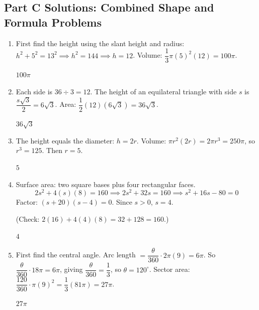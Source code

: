 \documentclass[14pt]{extarticle}
\begin{document}
\subsection*{Part C Solutions: Combined Shape and Formula Problems}
\begin{enumerate}
  \item First find the height using the slant height and radius: \(h^2 + 5^2 = 13^2 \implies h^2 = 144 \implies h = 12\). Volume: \(\dfrac{1}{3}\pi(5)^2(12) = 100\pi\).

  \(\boxed{100\pi}\)

  \item Each side is \(36 \div 3 = 12\). The height of an equilateral triangle with side \(s\) is \(\dfrac{s\sqrt{3}}{2} = 6\sqrt{3}\). Area: \(\dfrac{1}{2}(12)(6\sqrt{3}) = 36\sqrt{3}\).

  \(\boxed{36\sqrt{3}}\)

  \item The height equals the diameter: \(h = 2r\). Volume: \(\pi r^2(2r) = 2\pi r^3 = 250\pi\), so \(r^3 = 125\). Then \(r = 5\).

  \(\boxed{5}\)

  \item Surface area: two square bases plus four rectangular faces.
  \[
  2s^2 + 4(s)(8) = 160 \implies 2s^2 + 32s = 160 \implies s^2 + 16s - 80 = 0
  \]
  Factor: \((s + 20)(s - 4) = 0\). Since \(s > 0\), \(s = 4\).

  (Check: \(2(16) + 4(4)(8) = 32 + 128 = 160\).)

  \(\boxed{4}\)

  \item First find the central angle. Arc length \(= \dfrac{\theta}{360} \cdot 2\pi(9) = 6\pi\). So \(\dfrac{\theta}{360} \cdot 18\pi = 6\pi\), giving \(\dfrac{\theta}{360} = \dfrac{1}{3}\), so \(\theta = 120^\circ\). Sector area: \(\dfrac{120}{360} \cdot \pi(9)^2 = \dfrac{1}{3}(81\pi) = 27\pi\).

  \(\boxed{27\pi}\)
\end{enumerate}
\end{document}
